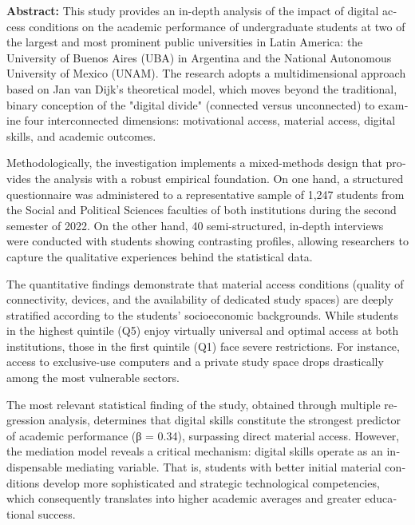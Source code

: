 \begin{tcolorbox}[colback=brown!8!white,colframe=brown!8!white,boxrule=0pt,arc=2pt,left=4pt,right=4pt,top=3pt,bottom=3pt,before skip=4pt,after skip=4pt]
\begin{otherlanguage}{english}
\sffamily\small \textbf{Abstract:} This study provides an in-depth analysis of the impact of digital access conditions on the academic performance of undergraduate students at two of the largest and most prominent public universities in Latin America: the University of Buenos Aires (UBA) in Argentina and the National Autonomous University of Mexico (UNAM). The research adopts a multidimensional approach based on Jan van Dijk’s theoretical model, which moves beyond the traditional, binary conception of the "digital divide" (connected versus unconnected) to examine four interconnected dimensions: motivational access, material access, digital skills, and academic outcomes.

Methodologically, the investigation implements a mixed-methods design that provides the analysis with a robust empirical foundation. On one hand, a structured questionnaire was administered to a representative sample of 1,247 students from the Social and Political Sciences faculties of both institutions during the second semester of 2022. On the other hand, 40 semi-structured, in-depth interviews were conducted with students showing contrasting profiles, allowing researchers to capture the qualitative experiences behind the statistical data.

The quantitative findings demonstrate that material access conditions (quality of connectivity, devices, and the availability of dedicated study spaces) are deeply stratified according to the students' socioeconomic backgrounds. While students in the highest quintile (Q5) enjoy virtually universal and optimal access at both institutions, those in the first quintile (Q1) face severe restrictions. For instance, access to exclusive-use computers and a private study space drops drastically among the most vulnerable sectors.

The most relevant statistical finding of the study, obtained through multiple regression analysis, determines that digital skills constitute the strongest predictor of academic performance (β = 0.34), surpassing direct material access. However, the mediation model reveals a critical mechanism: digital skills operate as an indispensable mediating variable. That is, students with better initial material conditions develop more sophisticated and strategic technological competencies, which consequently translates into higher academic averages and greater educational success.


\end{otherlanguage}
\end{tcolorbox}
